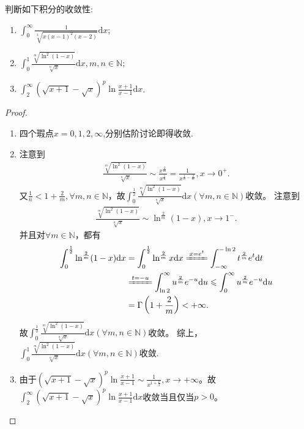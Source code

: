 \documentclass[../../main.tex]{subfiles}
\begin{document}
\begin{example}
判断如下积分的收敛性:
\begin{enumerate}
\item  \(\int_{0}^{\infty}\frac{1}{\sqrt[3]{x(x - 1)^2(x - 2)}}\mathrm{d}x\);

\item \(\int_{0}^{1}\frac{\sqrt[m]{\ln^2(1 - x)}}{\sqrt[n]{x}}\mathrm{d}x, m,n\in\mathbb{N}\);

\item \(\int_{2}^{\infty}(\sqrt{x + 1}-\sqrt{x})^p\ln\frac{x + 1}{x - 1}\mathrm{d}x\).
\end{enumerate}
\end{example}
\begin{proof}
\begin{enumerate}
\item 四个瑕点$x=0,1,2,\infty$,分别估阶讨论即得收敛.

\item 注意到
\begin{align*}
\frac{\sqrt[m]{\ln ^2(1 - x)}}{\sqrt[n]{x}}\sim\frac{x^{\frac{2}{m}}}{x^{\frac{1}{n}}}=\frac{1}{x^{\frac{1}{n}-\frac{2}{m}}},x\rightarrow 0^+.
\end{align*}
又\(\frac{1}{n}<1+\frac{2}{m},\forall m,n\in \mathbb{N}\)，故\(\int_{0}^{\frac{1}{2}}\frac{\sqrt[m]{\ln ^2(1 - x)}}{\sqrt[n]{x}}\mathrm{d}x\left( \forall m,n\in \mathbb{N} \right)\)收敛。
注意到
\begin{align*}
\frac{\sqrt[m]{\ln ^2(1 - x)}}{\sqrt[n]{x}}\sim\ln ^{\frac{2}{m}}(1 - x),x\rightarrow 1^-.
\end{align*}
并且对\(\forall m\in \mathbb{N}\)，都有
\begin{align*}
\int_0^{\frac{1}{2}}{\ln ^{\frac{2}{m}}(1}-x)\mathrm{d}x&=\int_0^{\frac{1}{2}}{\ln ^{\frac{2}{m}}x\mathrm{d}x\xlongequal{x=e^t}\int_{-\infty}^{-\ln 2}{t^{\frac{2}{m}}e^t\mathrm{d}t}}
\\
&\xlongequal{t=-u}\int_{\ln 2}^{\infty}{u^{\frac{2}{m}}e^{-u}\mathrm{d}u}\leqslant \int_0^{\infty}{u^{\frac{2}{m}}e^{-u}\mathrm{d}u}
\\
&=\Gamma \left( 1+\frac{2}{m} \right) <+\infty .
\end{align*}
故\(\int_{0}^{\frac{1}{2}}\frac{\sqrt[m]{\ln ^2(1 - x)}}{\sqrt[n]{x}}\mathrm{d}x\left( \forall m,n\in \mathbb{N} \right)\)收敛。
综上，\(\int_{0}^{1}\frac{\sqrt[m]{\ln ^2(1 - x)}}{\sqrt[n]{x}}\mathrm{d}x\left( \forall m,n\in \mathbb{N} \right)\)收敛.

\item 由于\((\sqrt{x + 1} - \sqrt{x})^p\ln\frac{x + 1}{x - 1}\sim\frac{1}{x^{1+\frac{p}{2}}},x\rightarrow +\infty\)。故\(\int_{2}^{\infty}(\sqrt{x + 1} - \sqrt{x})^p\ln\frac{x + 1}{x - 1} \mathrm{d}x\)收敛当且仅当\(p > 0\)。 
\end{enumerate}
\end{proof}
\end{document}
